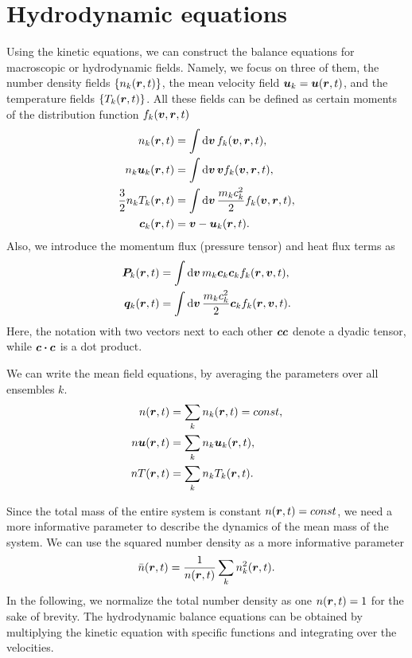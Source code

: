 \documentclass[aps,prl,preprint,groupedaddress,10pt]{revtex4-2}
\begin{document}
\section{Hydrodynamic equations}
Using the kinetic equations, we can construct the balance equations for macroscopic or
hydrodynamic fields. Namely, we focus on three of them, the number density fields
$\Bqty{n_k\pqty{\br,t}}$, the mean velocity field $\bu_k=\bu\pqty{\br,t}$, and the temperature
fields $\Bqty{T_k\pqty{\br,t}}$. All these fields can be defined as certain moments of the
distribution function $f_k\pqty{\bv, \br,t}$
\begin{equation}
    \begin{split}
        n_k\pqty{\br,t} &= \int\dd{\bv} f_k\pqty{\bv,\br,t},\\
        n_k\bu_k\pqty{\br,t} &= \int\dd{\bv} \bv f_k\pqty{\bv,\br,t},\\
        \frac{3}{2}n_kT_k\pqty{\br,t} &= \int\dd{\bv}\frac{m_kc_k^2}{2}f_k\pqty{\bv,\br,t},\\
        \bc_k\pqty{\br,t} &= \bv - \bu_k\pqty{\br,t}.
    \end{split}
\end{equation}
Also, we introduce the momentum flux (pressure tensor) and heat flux terms as
\begin{equation}
    \begin{split}
        \bP_k\pqty{\br,t} &= \int\dd{\bv}m_k\bc_k\bc_kf_k\pqty{\br,\bv,t},\\
        \bq_k\pqty{\br,t} &= \int\dd{\bv}\frac{m_kc_k^2}{2}\bc_kf_k\pqty{\br,\bv,t}.
    \end{split}
\end{equation}
Here, the notation with two vectors next to each other $\vb*{c}\vb*{c}$ denote a dyadic tensor, while
$\bc\vdot\bc$ is a dot product.

We can write the mean field equations, by averaging the parameters over all ensembles $k$.
\begin{equation}
    \begin{split}
        n\pqty{\br,t} &= \sum_kn_k\pqty{\br,t}=const,\\
        n\bu\pqty{\br,t} &= \sum_kn_k\bu_k\pqty{\br,t},\\
        nT\pqty{\br,t} &= \sum_kn_kT_k\pqty{\br,t}.
    \end{split}
\end{equation}

Since the total mass of the entire system is constant $n\pqty{\br,t}=const$, we need a more
informative parameter to describe the dynamics of the mean mass of the system. We can use the
squared number density as a more informative parameter
\begin{equation}
    \bar{n}\pqty{\br,t}=\frac{1}{n\pqty{\br,t}}\sum_kn_k^2\pqty{\br,t}.
\end{equation}
In the following, we normalize the total number density as one $n\pqty{\br,t}=1$ for the sake
of brevity. The hydrodynamic balance equations can be obtained by multiplying the kinetic
equation with specific functions and integrating over the velocities.
\end{document}

